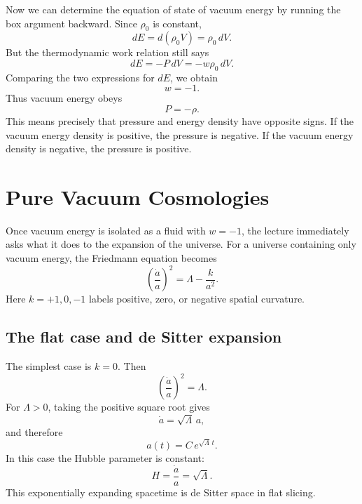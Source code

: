 Now we can determine the equation of state of vacuum energy by running the box argument backward. Since \(\rho_0\) is constant,
\begin{equation}
dE=d(\rho_0 V)=\rho_0\,dV.
\end{equation}
But the thermodynamic work relation still says
\begin{equation}
dE=-P\,dV=-w\rho_0\,dV.
\end{equation}
Comparing the two expressions for \(dE\), we obtain
\begin{equation}
w=-1.
\end{equation}
Thus vacuum energy obeys
\begin{equation}
P=-\rho.
\end{equation}
This means precisely that pressure and energy density have opposite signs. If the vacuum energy density is positive, the pressure is negative. If the vacuum energy density is negative, the pressure is positive.

\section{Pure Vacuum Cosmologies}

Once vacuum energy is isolated as a fluid with \(w=-1\), the lecture immediately asks what it does to the expansion of the universe. For a universe containing only vacuum energy, the Friedmann equation becomes
\begin{equation}
\left(\frac{\dot a}{a}\right)^2=\Lambda-\frac{k}{a^2}.
\end{equation}
Here \(k=+1,0,-1\) labels positive, zero, or negative spatial curvature.

\subsection{The flat case and de Sitter expansion}

The simplest case is \(k=0\). Then
\begin{equation}
\left(\frac{\dot a}{a}\right)^2=\Lambda.
\end{equation}
For \(\Lambda>0\), taking the positive square root gives
\begin{equation}
\dot a=\sqrt{\Lambda}\,a,
\end{equation}
and therefore
\begin{equation}
a(t)=C\,e^{\sqrt{\Lambda}\,t}.
\end{equation}
In this case the Hubble parameter is constant:
\begin{equation}
H=\frac{\dot a}{a}=\sqrt{\Lambda}.
\end{equation}
This exponentially expanding spacetime is de Sitter space in flat slicing.

